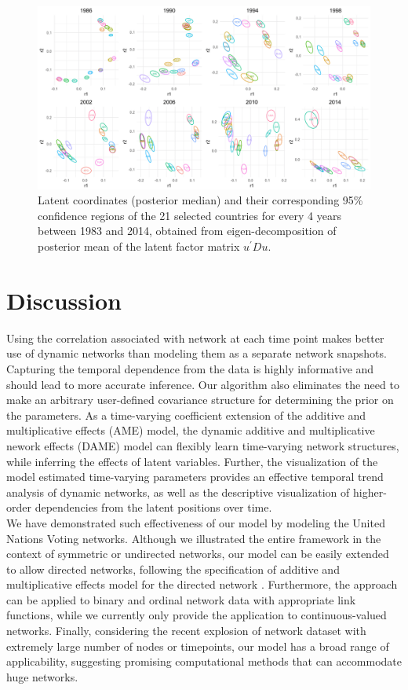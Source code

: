 \documentclass[a4paper]{article}
\begin{document}
  \begin{figure}[ht]
  	\begin{center}  
  		 \includegraphics[width=1\textwidth]{plots_paper/UDU-1.png}
  		  		  		    		  	\end{center}
  	\caption {Latent coordinates (posterior median) and their corresponding 95\% confidence regions of the 21 selected countries for every 4 years between 1983 and 2014, obtained from eigen-decomposition of posterior mean of the latent factor matrix $u^\prime Du$. }
  	\label{figure:UDplot}
  \end{figure}
\newpage
\section{Discussion}
Using the correlation associated with network at each time point makes better use of dynamic networks than modeling them as a separate network snapshots. Capturing the temporal dependence from the data is highly informative and should lead to more accurate inference. Our algorithm also eliminates the need to make an arbitrary user-defined covariance structure for determining the prior on the parameters. As a time-varying coefficient extension of the additive and multiplicative effects (AME) model, the dynamic additive and multiplicative nework effects (DAME) model can flexibly learn time-varying network structures, while inferring the effects of latent variables. Further, the visualization of the model estimated time-varying parameters provides an effective temporal trend analysis of dynamic networks, as well as the descriptive visualization of higher-order dependencies from the latent positions over time.
\\\newline
We have demonstrated such effectiveness of our model by modeling the United Nations Voting networks. Although we illustrated the entire framework in the context of symmetric or undirected networks, our model can be easily extended to allow directed networks, following the specification of additive and multiplicative effects model for the directed network \citep{minhas2016inferential}. Furthermore, the approach can be applied to binary and ordinal network data with appropriate link functions, while we currently only provide the application to continuous-valued networks.  Finally, considering the recent explosion of network dataset with extremely large number of nodes or timepoints, our model has a broad range of applicability, suggesting promising computational methods that can accommodate huge networks.


\newpage
\end{document}
